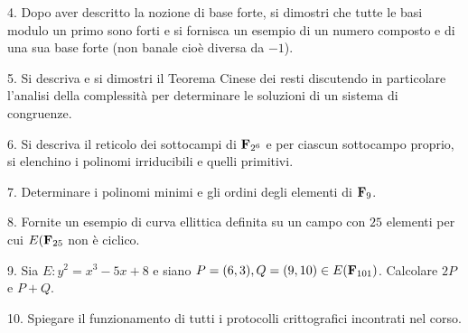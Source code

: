 \item{4.} Dopo aver descritto la nozione di base forte, si dimostri che tutte le basi modulo un primo sono forti e si fornisca
un esempio di un numero composto e di una sua base forte (non banale cio\`e diversa da $-1$).  
\vv


\item{5.} Si descriva e si dimostri il Teorema Cinese dei resti discutendo in particolare l'analisi della complessit\`a
per determinare le soluzioni di un sistema di congruenze.
\ve\vs

\item{6.} Si descriva il reticolo dei sottocampi di ${\bf F}_{2^6}$ e per ciascun sottocampo proprio, si elenchino i polinomi
irriducibili e quelli primitivi.

\vv

\item{7.} Determinare i polinomi minimi e gli ordini degli elementi di ${\bf F}_{9}$.
\vv

\item{8.} Fornite un esempio di curva ellittica definita su un campo con $25$ elementi per cui $E({\bf F}_{25}$ non \`e
ciclico.
\ve \vs

\item{9.} Sia $E : y^2 = x^3 − 5x + 8$ e siano $P = (6, 3),Q = (9, 10) \in E({\bf F}_{101})$. Calcolare $2P$ e $P+Q$.
\vv

\item{10.} Spiegare il funzionamento di tutti i protocolli crittografici incontrati nel corso.
\ \vst

 \bye
